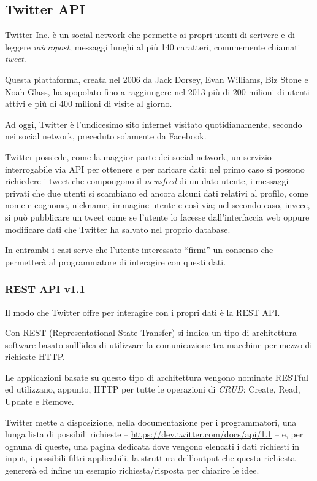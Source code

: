\subsection{Twitter API}
	Twitter Inc. è un social network che permette ai propri utenti di scrivere e di leggere \emph{micropost}, messaggi lunghi al più 140 caratteri, comunemente chiamati \emph{tweet}. 

	Questa piattaforma, creata nel 2006 da Jack Dorsey, Evan Williams, Biz Stone e Noah Glass, ha spopolato fino a raggiungere nel 2013 più di 200 milioni di utenti attivi e più di 400 milioni di visite al giorno\cite{twitter_data}.

	Ad oggi, Twitter è l'undicesimo sito internet visitato quotidianamente, secondo nei social network, preceduto solamente da Facebook\cite{twitter_alexa}.

	Twitter possiede, come la maggior parte dei social network, un servizio interrogabile via API per ottenere e per caricare dati: nel primo caso si possono richiedere i tweet che compongono il \emph{newsfeed} di un dato utente, i messaggi privati che due utenti si scambiano ed ancora alcuni dati relativi al profilo, come nome e cognome, nickname, immagine utente e così via; nel secondo caso, invece, si può pubblicare un tweet come se l'utente lo facesse dall'interfaccia web oppure modificare dati che Twitter ha salvato nel proprio database. 

	In entrambi i casi serve che l'utente interessato ``firmi'' un consenso che permetterà al programmatore di interagire con questi dati. 

	\subsubsection{REST API v1.1}
		Il modo che Twitter offre per interagire con i propri dati è la REST API. 
	
		Con REST (Representational State Transfer) si indica un tipo di architettura software basato sull'idea di utilizzare la comunicazione tra macchine per mezzo di richieste HTTP.

		Le applicazioni basate su questo tipo di architettura vengono nominate RESTful ed utilizzano, appunto, HTTP per tutte le operazioni di \emph{CRUD}: Create, Read, Update e Remove.

		Twitter mette a disposizione, nella documentazione per i programmatori\cite{twitter_doc}, una lunga lista di possibili richieste -- \url{https://dev.twitter.com/docs/api/1.1} -- e, per ognuna di queste, una pagina dedicata dove vengono elencati i dati richiesti in input, i possibili filtri applicabili, la struttura dell'output che questa richiesta genererà ed infine un esempio richiesta/risposta per chiarire le idee.

